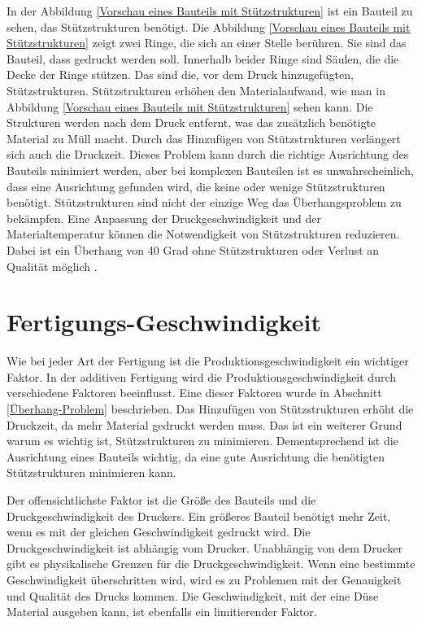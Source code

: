 In der Abbildung \ref{Vorschau eines Bauteils mit Stützstrukturen} ist ein Bauteil zu sehen, das Stützstrukturen benötigt. Die Abbildung \ref{Vorschau eines Bauteils mit Stützstrukturen} zeigt zwei Ringe, die sich an einer Stelle berühren. Sie sind das Bauteil, dass gedruckt werden soll. 
Innerhalb beider Ringe sind Säulen, die die Decke der Ringe stützen. Das sind die, vor dem Druck hinzugefügten, Stützstrukturen. Stützstrukturen erhöhen den Materialaufwand, wie man in Abbildung \ref{Vorschau eines Bauteils mit Stützstrukturen} sehen kann.
Die Strukturen werden nach dem Druck entfernt, was das zusätzlich benötigte Material zu Müll macht. Durch das Hinzufügen von Stützstrukturen verlängert sich auch die Druckzeit. Dieses Problem kann durch die richtige Ausrichtung des Bauteils minimiert werden, 
aber bei komplexen Bauteilen ist es unwahrscheinlich, dass eine Ausrichtung gefunden wird, die keine oder wenige Stützstrukturen benötigt. Stützstrukturen sind nicht der einzige Weg das Überhangsproblem zu bekämpfen. Eine Anpassung der Druckgeschwindigkeit 
und der Materialtemperatur können die Notwendigkeit von Stützstrukturen reduzieren. Dabei ist ein Überhang von 40 Grad ohne Stützstrukturen oder Verlust an Qualität möglich \cite{jiang2018investigation}. 

\section{Fertigungs-Geschwindigkeit}
\label{Fertigungs-Geschwindigkeit}

Wie bei jeder Art der Fertigung ist die Produktionsgeschwindigkeit ein wichtiger Faktor. In der additiven Fertigung wird die Produktionsgeschwindigkeit durch verschiedene Faktoren beeinflusst.
Eine dieser Faktoren wurde in Abschnitt \ref{Überhang-Problem} beschrieben. Das Hinzufügen von Stützstrukturen erhöht die Druckzeit, da mehr Material gedruckt werden muss. Das ist ein weiterer Grund warum es wichtig ist, Stützstrukturen zu minimieren.
Dementsprechend ist die Ausrichtung eines Bauteils wichtig, da eine gute Ausrichtung die benötigten Stützstrukturen minimieren kann.

\smallskip

Der offensichtlichste Faktor ist die Größe des Bauteils und die Druckgeschwindigkeit des Druckers. Ein größeres Bauteil benötigt mehr Zeit, wenn es mit der gleichen Geschwindigkeit gedruckt wird. Die Druckgeschwindigkeit ist abhängig vom Drucker.
Unabhängig von dem Drucker gibt es physikalische Grenzen für die Druckgeschwindigkeit. Wenn eine bestimmte Geschwindigkeit überschritten wird, wird es zu Problemen mit der Genauigkeit und Qualität des Drucks kommen. 
Die Geschwindigkeit, mit der eine Düse Material ausgeben kann, ist ebenfalls ein limitierender Faktor.

